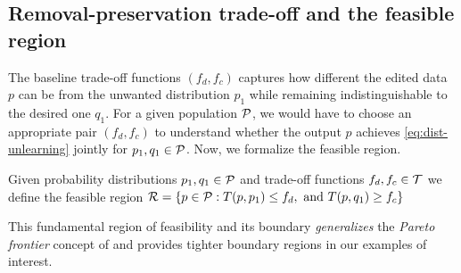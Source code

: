\subsection{Removal-preservation trade-off and the feasible region}
\vspace{-2 mm}
The baseline trade-off functions $(f_d,f_c)$ captures how different the edited data $p$ can be from the unwanted distribution $p_{1}$ while remaining indistinguishable to the desired one $q_1$. 
For a given population $\mathcal{P}$, we would have to choose an appropriate pair $(f_d,f_c)$ to understand whether the output $p$ achieves  \eqref{eq:dist-unlearning} jointly for $p_1, q_1 \in \mathcal{P}$. Now, we formalize the feasible region.
\vspace{-1 mm}
\begin{definition} \label{def:FR}
    Given probability distributions $p_1,q_1 \in \mathcal{P}$ and trade-off functions $f_d,f_c \in \mathcal{T}$ we define the feasible region  $\mathcal{R}=\{p \in \mathcal{P}: T(p, p_1) \leq f_d, \text{ and } T(p, q_1) \geq f_c\}$
\end{definition}
\begin{remark}
This fundamental region of feasibility and its boundary \textit{generalizes} the \emph{Pareto frontier} concept of \cite{allouah2025distributionalmachineunlearningselective} and provides tighter boundary regions in our examples of interest. 
\end{remark}
\vspace{-4 mm}
